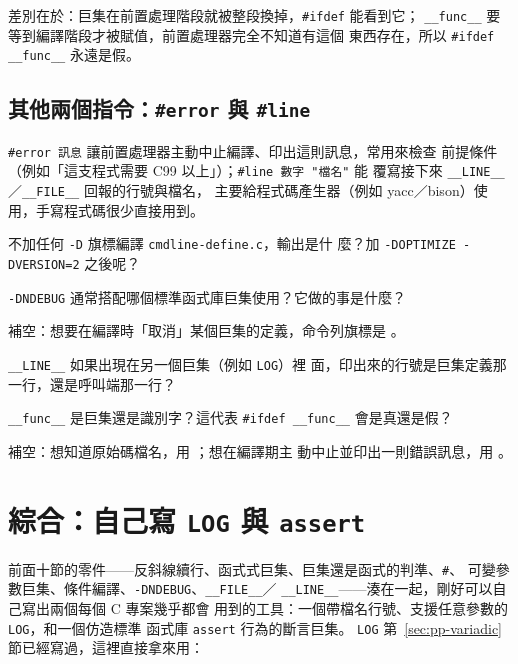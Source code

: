 差別在於：巨集在前置處理階段就被整段換掉，\texttt{\#ifdef} 能看到它；
\texttt{\_\_func\_\_} 要等到編譯階段才被賦值，前置處理器完全不知道有這個
東西存在，所以 \texttt{\#ifdef \_\_func\_\_} 永遠是假。

\subsection{其他兩個指令：\texttt{\#error} 與 \texttt{\#line}}

\texttt{\#error 訊息} 讓前置處理器主動中止編譯、印出這則訊息，常用來檢查
前提條件（例如「這支程式需要 C99 以上」）；\texttt{\#line 數字 "檔名"} 能
覆寫接下來 \texttt{\_\_LINE\_\_}／\texttt{\_\_FILE\_\_} 回報的行號與檔名，
主要給程式碼產生器（例如 yacc／bison）使用，手寫程式碼很少直接用到。


\begin{drills}[label=drills:pp-cmdline]
\item 不加任何 \texttt{-D} 旗標編譯 \texttt{cmdline-define.c}，輸出是什
麼？加 \texttt{-DOPTIMIZE -DVERSION=2} 之後呢？
\item \texttt{-DNDEBUG} 通常搭配哪個標準函式庫巨集使用？它做的事是什麼？
\item 補空：想要在編譯時「取消」某個巨集的定義，命令列旗標是
\underline{\hspace{2em}}。
\item \texttt{\_\_LINE\_\_} 如果出現在另一個巨集（例如 \texttt{LOG}）裡
面，印出來的行號是巨集定義那一行，還是呼叫端那一行？
\item \texttt{\_\_func\_\_} 是巨集還是識別字？這代表 \texttt{\#ifdef
\_\_func\_\_} 會是真還是假？
\item 補空：想知道原始碼檔名，用 \underline{\hspace{2em}}；想在編譯期主
動中止並印出一則錯誤訊息，用 \underline{\hspace{2em}}。
\end{drills}

\section{綜合：自己寫 \texttt{LOG} 與 \texttt{assert}}
\label{sec:pp-assert}

前面十節的零件——反斜線續行、函式式巨集、巨集還是函式的判準、\texttt{\#}、
可變參數巨集、條件編譯、\texttt{-DNDEBUG}、\texttt{\_\_FILE\_\_}／
\texttt{\_\_LINE\_\_}——湊在一起，剛好可以自己寫出兩個每個 C 專案幾乎都會
用到的工具：一個帶檔名行號、支援任意參數的 \texttt{LOG}，和一個仿造標準
函式庫 \texttt{assert} 行為的斷言巨集。 \texttt{LOG} 第~\ref{sec:pp-variadic}~
節已經寫過，這裡直接拿來用：

